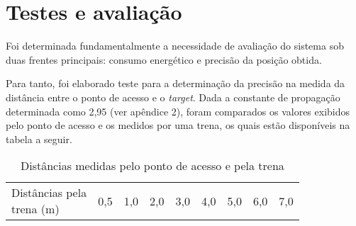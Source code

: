 \chapter{Testes e avaliação}

Foi determinada fundamentalmente a necessidade de avaliação do sistema sob duas frentes principais: consumo energético e precisão da posição obtida.

Para tanto, foi elaborado teste para a determinação da precisão na medida da distância entre o ponto de acesso e o \emph{target}. Dada a constante de propagação determinada como 2,95 (ver apêndice 2), foram comparados os valores exibidos pelo ponto de acesso e os medidos por uma trena, os quais estão disponíveis na tabela a seguir.

\begin{table}[ht]
\centering
\caption{Distâncias medidas pelo ponto de acesso e pela trena}
\vspace{0.5cm}
\begin{tabular}{l|cccccccc}
\hline
\makecell{Distâncias pela \\ trena (m)} & 0,5 & 1,0 & 2,0 & 3,0 & 4,0 & 5,0 & 6,0 & 7,0 \vspace{0.4cm}\\


\end{tabular}
\end{table}
